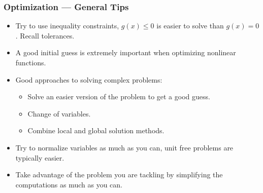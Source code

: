 \documentclass[11pt,xcolor={svgnames},aspectratio=169,usepdftitle=false]{beamer}
\begin{document}
\begin{frame}
  \frametitle{Optimization --- General Tips}
\begin{itemize}
  \item Try to use inequality constraints, $g(x) \leq 0$ is easier to solve than $g(x) = 0$. Recall tolerances.
  \item A good initial guess is extremely important when optimizing nonlinear functions.
  \item Good approaches to solving complex problems:
  \begin{itemize}
    \item Solve an easier version of the problem to get a good guess.
    \item Change of variables.
    \item Combine local and global solution methods.
  \end{itemize}
  \item Try to normalize variables as much as you can, unit free problems are typically easier.
  \item Take advantage of the problem you are tackling by simplifying the computations as much as you can.
\end{itemize}
\end{frame}
\end{document}
